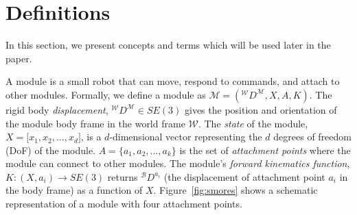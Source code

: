 \documentclass[graybox]{svmult}
\begin{document}
\section{Definitions}
\label{sec:preliminaries}
In this section, we present concepts and terms which will be used later in the paper.

\begin{definition}[Module] A module is a small robot that can move, respond to commands,
and attach to other modules.  Formally, we define a  module  as
$\mathcal{M}=({^\mathcal{W}}D^{\mathcal{M}}, X, A,K)$.
The rigid body \textit{displacement}, ${^\mathcal{W}}D^{\mathcal{M}}\in SE(3)$ 
gives the position and orientation of the module body frame in the world  frame $\mathcal{W}$.
The \textit{state} of the module, \(X=\lbrack x_1, x_2, \ldots, x_d \rbrack\),
 is a \(d\)-dimensional vector representing the \(d\) degrees of freedom (DoF) of the module.
$A=\{a_1, a_2, ..., a_k\}$ is the set of \textit{attachment points} where the 
module can connect to other modules.
The  module's \textit{forward kinematics function}, \(K: (X, a_i) \rightarrow SE(3) \) 
returns \({^\mathcal{B}}D^{a_{i}}\) (the displacement of attachment point \(a_i\) 
in the body frame) as a function of \(X\).
%
Figure~\ref{fig:smores} shows a schematic representation of a module with  four attachment points.
\end{definition}
%
\end{document}
